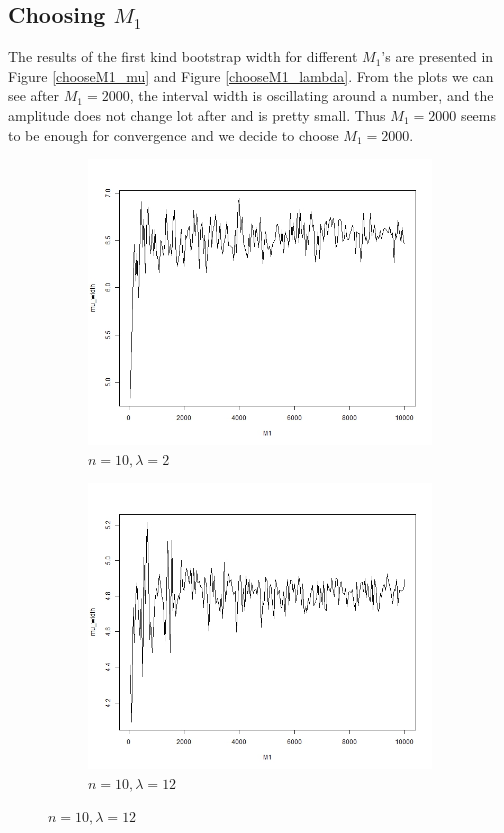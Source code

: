 \documentclass{article}
\begin{document}
    \subsection{Choosing $M_1$}
    The results of the first kind bootstrap width for different $M_1$'s are presented in Figure \ref{chooseM1_mu} and Figure \ref{chooseM1_lambda}. From the plots we can see after $M_1 = 2000$, the interval width is oscillating around a number, and the amplitude does not change  lot after and is pretty small. Thus $M_1 = 2000$ seems to be enough for convergence and we decide to choose $M_1 = 2000$. 
    \begin{figure}[!htb]
        \centering
    	\begin{subfigure}[b]{0.5\textwidth}
    	\includegraphics[width = \textwidth]{./Codes/mu_10_2.jpg}
    	\caption{$n = 10, \lambda = 2$}
    	\end{subfigure}%
    	\begin{subfigure}[b]{0.5\textwidth}
    	\includegraphics[width = \textwidth]{./Codes/mu_10_12.jpg}
    	\caption{$n = 10, \lambda = 12$}
    	\end{subfigure}%


\end{figure}
\end{document}
